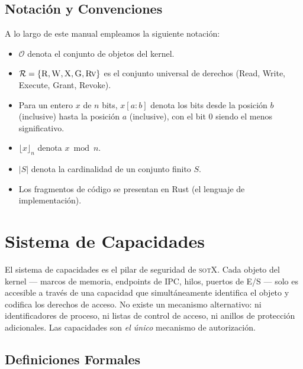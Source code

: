 \documentclass[11pt,twoside,openright]{book}
\theoremstyle{definition}
\theoremstyle{plain}
\theoremstyle{remark}
\newcommand{\sotos}{\textsc{sotX}}
\newcommand{\rights}{\mathcal{R}}
\begin{document}
\section{Notación y Convenciones}

A lo largo de este manual empleamos la siguiente notación:

\begin{itemize}
    \item $\mathcal{O}$ denota el conjunto de objetos del kernel.
    \item $\rights = \{\textsc{R}, \textsc{W}, \textsc{X}, \textsc{G}, \textsc{Rv}\}$ es el
          conjunto universal de derechos (Read, Write, Execute, Grant, Revoke).
    \item Para un entero $x$ de $n$ bits, $x[a{:}b]$ denota los bits desde la posición $b$
          (inclusive) hasta la posición $a$ (inclusive), con el bit 0 siendo el menos significativo.
    \item $\lfloor x \rfloor_n$ denota $x \bmod n$.
    \item $|S|$ denota la cardinalidad de un conjunto finito $S$.
    \item Los fragmentos de código se presentan en Rust (el lenguaje de implementación).
\end{itemize}


\chapter{Sistema de Capacidades}
\label{chap:capabilities}

El sistema de capacidades es el pilar de seguridad de \sotos{}. Cada objeto del kernel ---
marcos de memoria, endpoints de IPC, hilos, puertos de E/S --- solo es accesible a través
de una capacidad que simultáneamente identifica el objeto y codifica los derechos de acceso.
No existe un mecanismo alternativo: ni identificadores de proceso, ni listas de control de
acceso, ni anillos de protección adicionales. Las capacidades son \emph{el único} mecanismo
de autorización.

\section{Definiciones Formales}
\end{document}
